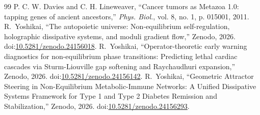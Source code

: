 \documentclass[11pt,a4paper]{article}
\begin{document}
\begin{thebibliography}{99}
 P. C. W. Davies and C. H. Lineweaver, ``Cancer tumors as Metazoa 1.0: tapping genes of ancient ancestors,'' \textit{Phys. Biol.}, vol. 8, no. 1, p. 015001, 2011.
 R.~Yoshikai, ``The autopoietic universe: Non-equilibrium self-regulation, holographic dissipative systems, and moduli gradient flow,'' Zenodo, 2026. doi:\href{https://doi.org/10.5281/zenodo.24156018}{10.5281/zenodo.24156018}.
 R.~Yoshikai, ``Operator-theoretic early warning diagnostics for non-equilibrium phase transitions: Predicting lethal cardiac cascades via Sturm-Liouville gap softening and Raychaudhuri expansion,'' Zenodo, 2026. doi:\href{https://doi.org/10.5281/zenodo.24156142}{10.5281/zenodo.24156142}.
 R.~Yoshikai, ``Geometric Attractor Steering in Non-Equilibrium Metabolic-Immune Networks: A Unified Dissipative Systems Framework for Type 1 and Type 2 Diabetes Remission and Stabilization,'' Zenodo, 2026. doi:\href{https://doi.org/10.5281/zenodo.24156293}{10.5281/zenodo.24156293}.
\end{thebibliography}
\end{document}
